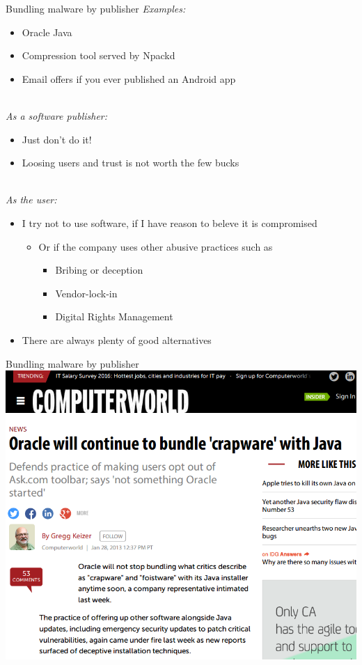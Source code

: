 \documentclass[11pt]{beamer}
\begin{document}
\begin{frame}{Bundling malware by publisher}
\emph{Examples:}
\begin{itemize}
\item Oracle Java
\item Compression tool served by Npackd %
\item Email offers if you ever published an Android app
\end{itemize}
\\[0.2cm]
\pause
\emph{As a software publisher:}
\begin{itemize}
\item Just don't do it!
\item Loosing users and trust is not worth the few bucks
\end{itemize}
\\[0.2cm]
\pause
\emph{As the user:}
\begin{itemize}
\item I try not to use software, if I have reason to beleve it is compromised %
\begin{itemize}
\item Or if the company uses other abusive practices such as
\begin{itemize}
\item Bribing or deception
\item Vendor-lock-in
\item Digital Rights Management
\end{itemize}
\end{itemize}
\item There are always plenty of good alternatives
\end{itemize}
\end{frame}

\begin{frame}{Bundling malware by publisher}
\includegraphics[scale=0.3]{oracle.png}
\end{frame}
\end{document}
